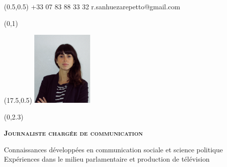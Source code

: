 \documentclass[30pt, french]{tccv}
\begin{document}
\begin{upshape}
\fontsize{9pt}{1em}\color{text}\selectfont



%
%




\begin{textblock}{6.5}(0.5,0.5)
    {+33 07 83 88 33 32}
    {r.sanhuezarepetto@gmail.com}
\end{textblock}

\begin{textblock}{21}(0,1)
\end{textblock}

\begin{textblock}{21}(17.5,0.5)
		\includegraphics[width=3cm]{../Figure/Rocio3.png}
\end{textblock}  



\begin{textblock}{21}(0,2.3)

\begin{center}
\fontsize{10pt}{1.5em}\color{text}\bodyfontlight\upshape\selectfont

	{\fontsize{14pt}{5em}\scshape\bfseries Journaliste chargée de communication \\} 

	\vspace{5pt}
Connaissances développées en communication sociale et science politique 			\\
Expériences dans le milieu parlamentaire et production de télévision  		 	\\
 			\\


\end{center}
\end{textblock}
\end{upshape}
\end{document}
